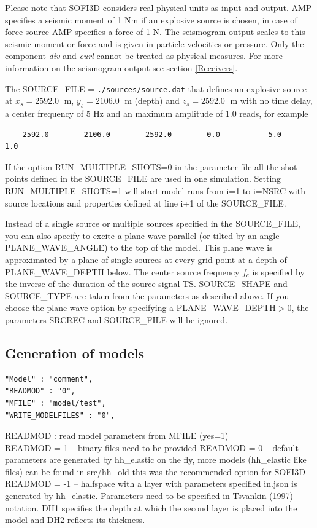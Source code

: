 \documentclass{hitec}
\begin{document}
Please note that SOFI3D considers real physical units as input and output. AMP specifies a seismic moment of 1 Nm if an explosive source is chosen, in case of force source AMP specifies a force of 1 N. The seismogram output scales to this seismic moment or force and is given in particle velocities or pressure. Only the component \textit{div} and \textit{curl} cannot be treated as physical measures. For more information on the seismogram output see section \ref{Receivers}.

The  SOURCE\_FILE =  \lstinline{./sources/source.dat} that defines an explosive source  at $x_s=2592.0\;$ m, $y_s=2106.0\;$ m (depth) and $z_s=2592.0\;$ m  with no time delay,
a center frequency of 5 Hz  and an maximum amplitude of 1.0 reads, for example
\begin{verbatim}
    2592.0        2106.0        2592.0        0.0           5.0           1.0
\end{verbatim}

If the option RUN\_MULTIPLE\_SHOTS=0 in the parameter file all the shot points defined in the SOURCE\_FILE are used in one simulation. Setting RUN\_MULTIPLE\_SHOTS=1 will start model runs 
from i=1 to i=NSRC with source locations and properties defined at line i+1 of the SOURCE\_FILE. 

Instead of a single source or multiple sources specified in the SOURCE\_FILE, you can also specify to excite a plane wave parallel (or tilted by an angle PLANE\_WAVE\_ANGLE) to the top of the model. This plane wave is approximated by a plane of single sources at every grid point at a depth of PLANE\_WAVE\_DEPTH below. The center source frequency $f_c$ is specified by the inverse of the duration of the source signal TS. SOURCE\_SHAPE and SOURCE\_TYPE are taken from the parameters as described above. If you choose the plane wave option by specifying a PLANE\_WAVE\_DEPTH$>$0, the parameters SRCREC and SOURCE\_FILE will be ignored.

\subsection{Generation of models}
\label{gen_of_mod}
\begin{verbatim}
"Model" : "comment",
"READMOD" : "0",
"MFILE" : "model/test",
"WRITE_MODELFILES" : "0",

\end{verbatim}
READMOD : read model parameters from MFILE (yes=1) \\
READMOD = 1 -- binary files need to be provided
READMOD = 0 -- default parameters are generated by hh\_elastic on the fly, more models (hh\_elastic like files) can be found in src/hh\_old 
this was the recommended option for SOFI3D\\
READMOD = -1 -- halfspace with a layer with parameters specified in.json is generated by hh\_elastic. Parameters need to be specified in Tsvankin (1997) notation. DH1 specifies the depth at which the second layer is placed into the model and DH2 reflects its thickness.
\end{document}
